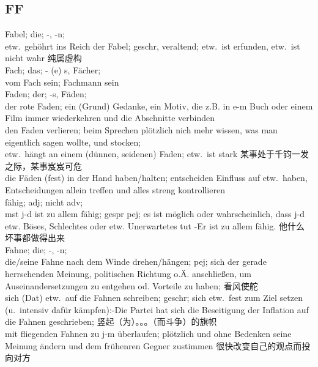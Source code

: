 \subsection{FF}
\label{app:dict:FF}
\noindent
Fabel; die; -, -n;\\
etw.\ geh\"ohrt ins Reich der Fabel; geschr, veraltend; etw.\ ist erfunden, etw.\ ist nicht wahr 纯属虚构\\

\noindent
Fach; das; \-- (e) s, F\"acher;\\
vom Fach sein; Fachmann sein\\

\noindent
Faden; der; -s, F\"aden;\\
der rote Faden; ein (Grund) Gedanke, ein Motiv, die z.B. in e-m Buch oder einem Film immer wiederkehren und die Abschnitte verbinden\\
den Faden verlieren; beim Sprechen pl\"otzlich nich mehr wissen, was man eigentlich sagen wollte, und stocken;\\
etw.\ h\"angt an einem (d\"unnen, seidenen) Faden; etw.\ ist stark  某事处于千钧一发之际，某事岌岌可危\\
die F\"aden (fest) in der Hand haben/halten; entscheiden Einfluss auf etw.\ haben, Entscheidungen allein treffen und alles streng kontrollieren\\

\noindent
f\"ahig; adj; nicht adv;\\
mst j-d ist zu allem f\"ahig; gespr pej; es ist m\"oglich oder wahrscheinlich, dass j-d etw. B\"oses, Schlechtes oder etw. Unerwartetes tut -Er ist zu allem f\"ahig. 他什么坏事都做得出来\\

\noindent
Fahne; die; -, -n;\\
die/seine Fahne nach dem Winde drehen/h\"angen; pej; sich der gerade herrschenden Meinung, politischen Richtung o.\"A. anschlie\ss{}en, um Auseinandersetzungen zu entgehen od. Vorteile zu haben; 看风使舵\\
sich (Dat) etw.\ auf die Fahnen schreiben; geschr; sich etw.\ fest zum Ziel setzen (u.\ intensiv daf\"ur k\"ampfen):-Die Partei hat sich die Beseitigung der Inflation auf die Fahnen geschrieben; 竖起（为）。。。（而斗争）的旗帜\\
mit fliegenden Fahnen zu j-m \"uberlaufen; pl\"otzlich und ohne Bedenken seine Meinung \"andern und dem fr\"uhenren Gegner zustimmen 很快改变自己的观点而投向对方\\

